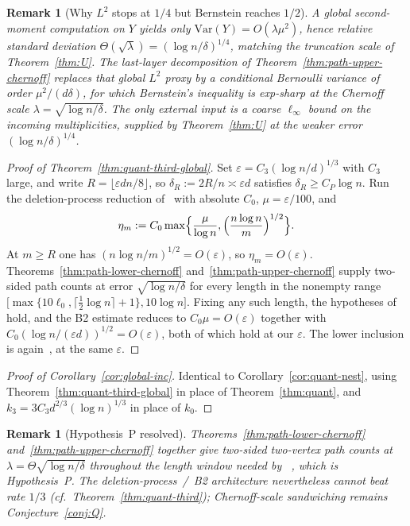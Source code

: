 \documentclass[11pt]{article}
\newtheorem{remark}[theorem]{Remark}
\newcommand{\Var}{\mathrm{Var}}
\begin{document}
\begin{remark}[Why \(L^{2}\) stops at \(1/4\) but Bernstein reaches \(1/2\)]
\label{rem:second-moment}
A global second-moment computation on \(Y\) yields only
\(\Var(Y)=O(\lambda\mu^2)\), hence relative standard deviation
\(\Theta(\sqrt{\lambda})=(\log n/\delta)^{1/4}\), matching the truncation
scale of Theorem~\ref{thm:U}.
The last-layer decomposition of Theorem~\ref{thm:path-upper-chernoff} replaces
that global \(L^{2}\) proxy by a \emph{conditional} Bernoulli variance of order
\(\mu^2/(d\delta)\), for which Bernstein's inequality is exp-sharp at the
Chernoff scale \(\lambda=\sqrt{\log n/\delta}\).
The only external input is a coarse \(\ell_\infty\) bound on the incoming
multiplicities, supplied by Theorem~\ref{thm:U} at the weaker error
\((\log n/\delta)^{1/4}\).
\end{remark}

\begin{proof}[Proof of Theorem~\ref{thm:quant-third-global}]
Set \(\varepsilon=C_3(\log n/d)^{1/3}\) with \(C_3\) large, and write
\(R=\lfloor\varepsilon dn/8\rfloor\), so \(\delta_R:=2R/n\asymp\varepsilon d\) satisfies
\(\delta_R\ge C_P\log n\).
Run the deletion-process reduction of~\cite[§3]{BIM25} with absolute \(C_0\),
\(\mu=\varepsilon/100\), and
\[
\eta_m:=C_0\max\Bigl\{\frac{\mu}{\log n},\Bigl(\frac{n\log n}{m}\Bigr)^{1/2}\Bigr\}.
\]
At \(m\ge R\) one has \((n\log n/m)^{1/2}=O(\varepsilon)\), so \(\eta_m=O(\varepsilon)\).
Theorems~\ref{thm:path-lower-chernoff} and~\ref{thm:path-upper-chernoff}
supply two-sided path counts at error \(\sqrt{\log n/\delta}\) for every length
in the nonempty range
\(\bigl[\max\{10\ell_0,\lceil\tfrac12\log n\rceil+1\},10\log n\bigr]\).
Fixing any such length, the hypotheses of~\cite[Theorem~4.1]{BIM25} hold, and
the B2 estimate reduces to \(C_0\mu=O(\varepsilon)\) together with
\(C_0(\log n/(\varepsilon d))^{1/2}=O(\varepsilon)\), both of which hold at our
\(\varepsilon\).
The lower inclusion is again~\cite[Lemma~2.2]{BIM25}, at the same \(\varepsilon\).
\end{proof}

\begin{proof}[Proof of Corollary~\ref{cor:global-inc}]
Identical to Corollary~\ref{cor:quant-nest}, using Theorem~\ref{thm:quant-third-global}
in place of Theorem~\ref{thm:quant}, and \(k_3=3C_3 d^{2/3}(\log n)^{1/3}\) in place of \(k_0\).
\end{proof}

\begin{remark}[Hypothesis~P resolved]
\label{rem:hyp-P}
Theorems~\ref{thm:path-lower-chernoff} and~\ref{thm:path-upper-chernoff}
together give two-sided two-vertex path counts at
\(\lambda=\Theta\sqrt{\log n/\delta}\) throughout the length window needed by
~\cite[Theorem~4.1]{BIM25}, which is Hypothesis~P.
The deletion-process~/~B2 architecture nevertheless cannot beat rate \(1/3\)
(cf.\ Theorem~\ref{thm:quant-third}); Chernoff-scale sandwiching remains
Conjecture~\ref{conj:Q}.
\end{remark}
\end{document}
